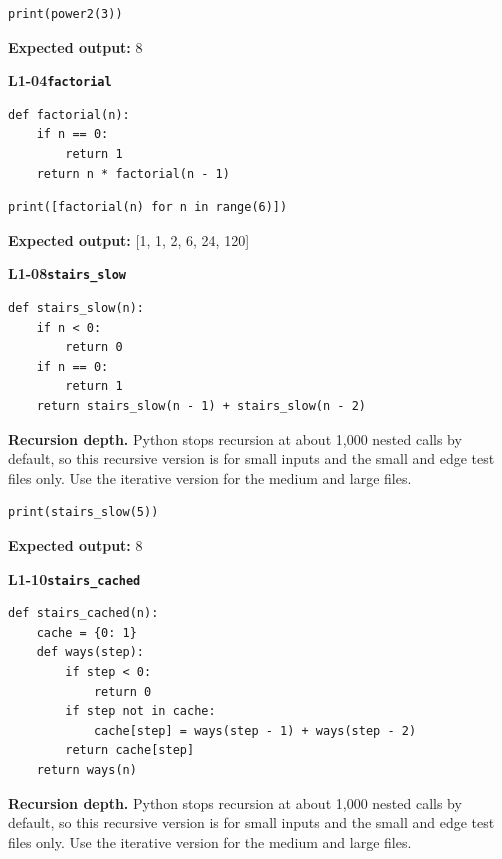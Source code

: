 \documentclass[11pt,a4paper]{article}
\begin{document}
\begin{lstlisting}
print(power2(3))
\end{lstlisting}
\textbf{Expected output:} 8
\par\bigskip
{}
{\color{teal}\textbf{L1-04}}\quad\textbf{\texttt{factorial}}\label{L1-code-factorial}\par
\begin{lstlisting}[style=numbered]
def factorial(n):
    if n == 0:
        return 1
    return n * factorial(n - 1)
\end{lstlisting}

\begin{lstlisting}
print([factorial(n) for n in range(6)])
\end{lstlisting}
\textbf{Expected output:} [1, 1, 2, 6, 24, 120]
\par\bigskip
{}
{\color{teal}\textbf{L1-08}}\quad\textbf{\texttt{stairs\_slow}}\label{L1-code-stairs_slow}\par
\begin{lstlisting}[style=numbered]
def stairs_slow(n):
    if n < 0:
        return 0
    if n == 0:
        return 1
    return stairs_slow(n - 1) + stairs_slow(n - 2)
\end{lstlisting}
\textbf{Recursion depth.} Python stops recursion at about 1,000 nested calls by default, so this recursive version is for small inputs and the small and edge test files only. Use the iterative version for the medium and large files.


\begin{lstlisting}
print(stairs_slow(5))
\end{lstlisting}
\textbf{Expected output:} 8
\par\bigskip
{}
{\color{teal}\textbf{L1-10}}\quad\textbf{\texttt{stairs\_cached}}\label{L1-code-stairs_cached}\par
\begin{lstlisting}[style=numbered]
def stairs_cached(n):
    cache = {0: 1}
    def ways(step):
        if step < 0:
            return 0
        if step not in cache:
            cache[step] = ways(step - 1) + ways(step - 2)
        return cache[step]
    return ways(n)
\end{lstlisting}
\textbf{Recursion depth.} Python stops recursion at about 1,000 nested calls by default, so this recursive version is for small inputs and the small and edge test files only. Use the iterative version for the medium and large files.
\end{document}
